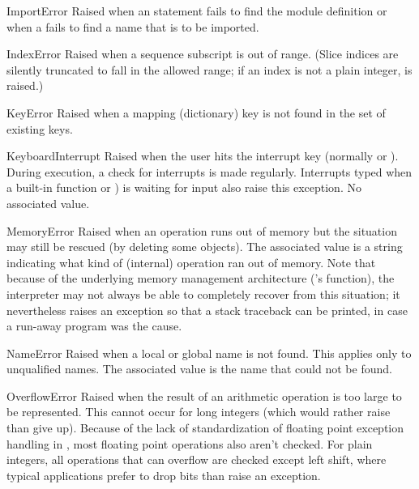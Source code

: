\begin{excdesc}{ImportError}
  Raised when an  statement fails to find the module
  definition or when a  fails to find a
  name that is to be imported.
\end{excdesc}

\begin{excdesc}{IndexError}
  Raised when a sequence subscript is out of range.  (Slice indices are
  silently truncated to fall in the allowed range; if an index is not a
  plain integer,  is raised.)
\end{excdesc}

\begin{excdesc}{KeyError}
  Raised when a mapping (dictionary) key is not found in the set of
  existing keys.
\end{excdesc}

\begin{excdesc}{KeyboardInterrupt}
  Raised when the user hits the interrupt key (normally
   or
).  During execution, a check for interrupts is made regularly.
  Interrupts typed when a built-in function  or
  ) is waiting for input also raise this exception.  No
  associated value.
\end{excdesc}

\begin{excdesc}{MemoryError}
  Raised when an operation runs out of memory but the situation may
  still be rescued (by deleting some objects).  The associated value is
  a string indicating what kind of (internal) operation ran out of memory.
  Note that because of the underlying memory management architecture
  (\C{}'s  function), the interpreter may not always be able
  to completely recover from this situation; it nevertheless raises an
  exception so that a stack traceback can be printed, in case a run-away
  program was the cause.
\end{excdesc}

\begin{excdesc}{NameError}
  Raised when a local or global name is not found.  This applies only
  to unqualified names.  The associated value is the name that could
  not be found.
\end{excdesc}

\begin{excdesc}{OverflowError}
  Raised when the result of an arithmetic operation is too large to be
  represented.  This cannot occur for long integers (which would rather
  raise  than give up).  Because of the lack of
  standardization of floating point exception handling in \C{}, most
  floating point operations also aren't checked.  For plain integers,
  all operations that can overflow are checked except left shift, where
  typical applications prefer to drop bits than raise an exception.
\end{excdesc}


